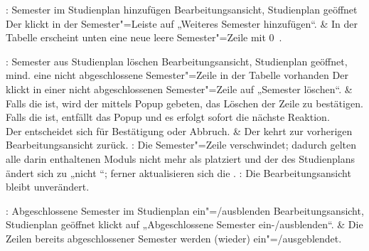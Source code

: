 \begin{usecase}{: Semester im Studienplan hinzufügen}
	{Bearbeitungsansicht, \gls{Studienplan} geöffnet}
	Der  klickt in der Semester"=Leiste auf „Weiteres Semester hinzufügen“.
	& In der Tabelle erscheint unten eine neue leere Semester"=Zeile mit 0~.
\end{usecase}

\begin{usecase}{: Semester aus Studienplan löschen}
	{Bearbeitungsansicht, \gls{Studienplan} geöffnet, mind. eine nicht abgeschlossene Semester"=Zeile in der Tabelle vorhanden}
	Der  klickt in einer nicht abgeschlossenen Semester"=Zeile auf „Semester löschen“.
	& Falls die  ist, wird der  mittels \gls{Popup} gebeten, das Löschen der Zeile zu bestätigen. \newline 
	Falls die  ist, entfällt das \gls{Popup} und es erfolgt sofort die nächste Reaktion.\\
	\hline
	Der  entscheidet sich für Bestätigung oder Abbruch.
	& Der  kehrt zur vorherigen Bearbeitungsansicht zurück. \newline 
	: Die Semester"=Zeile verschwindet; dadurch gelten alle darin enthaltenen \glspl{Modul} nicht mehr als platziert und der  des Studienplans ändert sich zu „nicht “; ferner aktualisieren sich die . \newline
	: Die Bearbeitungsansicht bleibt unverändert.
\end{usecase}

\begin{usecase}{: Abgeschlossene Semester im Studienplan ein"=/ausblenden}
	{Bearbeitungsansicht, \gls{Studienplan} geöffnet}
	 klickt auf „Abgeschlossene Semester ein-/ausblenden“.
	& Die Zeilen bereits abgeschlossener Semester werden (wieder) ein"=/ausgeblendet.
\end{usecase}

